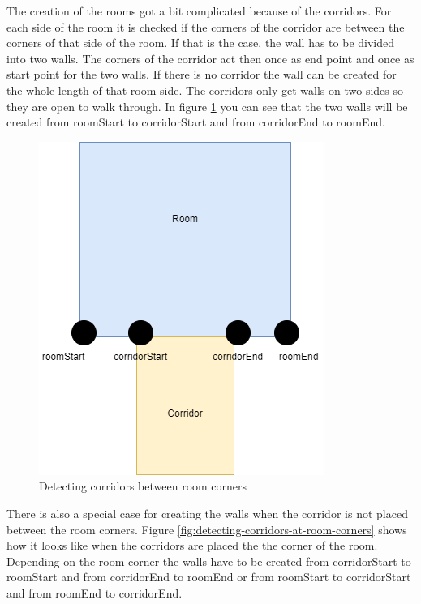 \documentclass[a4paper,11pt,oneside]{scrreprt}
\begin{document}
The creation of the rooms got a bit complicated because of the corridors. For each side of the room it is checked if the corners of the corridor are between the corners of that side of the room. If that is the case, the wall has to be divided into two walls. The corners of the corridor act then once as end point and once as start point for the two walls. If there is no corridor the wall can be created for the whole length of that room side. The corridors only get walls on two sides so they are open to walk through. In figure \ref{fig:detecting-corridors-between-room-corners} you can see that the two walls will be created from roomStart to corridorStart and from corridorEnd to roomEnd.
\begin{figure}[htb]
	\centering
	\includegraphics[scale=0.49]{images/detecting_corridors.drawio.png}    
	\caption{Detecting corridors between room corners}
	\label{fig:detecting-corridors-between-room-corners}
\end{figure}

There is also a special case for creating the walls when the corridor is not placed between the room corners. Figure \ref{fig:detecting-corridors-at-room-corners} shows how it looks like when the corridors are placed the the corner of the room. Depending on the room corner the walls have to be created from corridorStart to roomStart and from corridorEnd to roomEnd or from roomStart to corridorStart and from roomEnd to corridorEnd.
\end{document}
